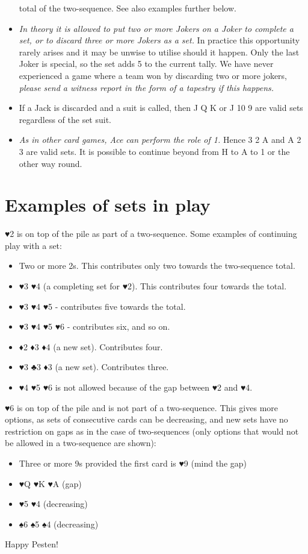 \documentclass[a4paper,11pt]{scrartcl}
\begin{document}
\begin{itemize}
        total of the two-sequence. See also examples further below.
  \item \emph{In theory it is allowed to put two or more Jokers on a Joker to
        complete a set, or to discard three or more Jokers as a set.} In
        practice this opportunity rarely arises and it may be unwise to utilise
        should it happen. Only the last Joker is special, so the set adds 5 to
        the current tally. We have never experienced a game where a team won by
        discarding two or more jokers, \emph{please send a witness report in the
        form of a tapestry if this happens.}
  \item If a Jack is discarded and a suit is called, then J Q K or J 10 9 are
        valid sets regardless of the set suit.
  \item \emph{As in other card games, Ace can perform the role of 1.} Hence 3 2
        A and A 2 3 are valid sets. It is possible to continue beyond from H to
        A to 1 or the other way round.
 \end{itemize}

 \section{Examples of sets in play}

 ♥2 is on top of the pile as part of a two-sequence. Some examples of continuing
 play with a set:

 \begin{itemize}
  \item Two or more 2s. This contributes only two towards the two-sequence
        total.
  \item ♥3 ♥4 (a completing set for ♥2). This contributes four towards the
        total.
  \item ♥3 ♥4 ♥5 - contributes five towards the total.
  \item ♥3 ♥4 ♥5 ♥6 - contributes six, and so on.
  \item ♦2 ♦3 ♦4 (a new set). Contributes four.
  \item ♥3 ♣3 ♦3 (a new set). Contributes three.
  \item ♥4 ♥5 ♥6 is not allowed because of the gap between ♥2 and ♥4.
 \end{itemize}

 ♥6 is on top of the pile and is not part of a two-sequence. This gives more
 options, as sets of consecutive cards can be decreasing, and new sets have no
 restriction on gaps as in the case of two-sequences (only options that would
 not be allowed in a two-sequence are shown):

 \begin{itemize}
  \item Three or more 9s provided the first card is ♥9 (mind the gap)
  \item ♥Q ♥K ♥A (gap)
  \item ♥5 ♥4 (decreasing)
  \item ♠6 ♠5 ♠4 (decreasing)
 \end{itemize}

 Happy Pesten!
\end{document}
